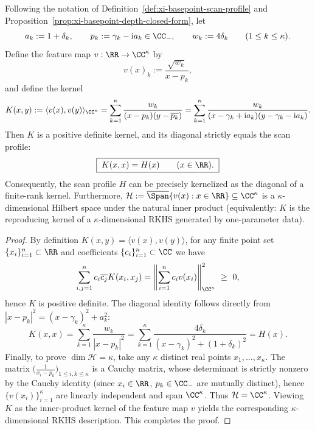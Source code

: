 \begin{theorem}\label{thm:xi-basepoint-scan-finite-rank-rkhs}
Following the notation of Definition~\ref{def:xi-basepoint-scan-profile} and Proposition~\ref{prop:xi-basepoint-depth-closed-form}, let
\[
a_k:=1+\delta_k,\qquad
p_k:=\gamma_k-\mathrm{i}a_k\in\CC_{-},\qquad
w_k:=4\delta_k\qquad(1\le k\le \kappa).
\]
Define the feature map \(v:\RR\to\CC^{\kappa}\) by
\[
v(x)_k:=\frac{\sqrt{w_k}}{x-p_k},
\]
and define the kernel
\[
K(x,y):=\langle v(x),v(y)\rangle_{\CC^{\kappa}}
=\sum_{k=1}^{\kappa}\frac{w_k}{(x-p_k)(y-\overline{p_k})}
=\sum_{k=1}^{\kappa}\frac{w_k}{(x-\gamma_k+\mathrm{i}a_k)(y-\gamma_k-\mathrm{i}a_k)}.
\]
Then \(K\) is a positive definite kernel, and its diagonal strictly equals the scan profile:
\[
\boxed{\;K(x,x)=H(x)\qquad(x\in\RR).\;}
\]
Consequently, the scan profile \(H\) can be precisely kernelized as the diagonal of a finite-rank kernel.
Furthermore, \(\mathcal{H}:=\overline{\Span}\{v(x):x\in\RR\}\subseteq\CC^\kappa\) is a \(\kappa\)-dimensional Hilbert space under the natural inner product (equivalently: \(K\) is the reproducing kernel of a \(\kappa\)-dimensional RKHS generated by one-parameter data).
\end{theorem}
\begin{proof}
By definition \(K(x,y)=\langle v(x),v(y)\rangle\), for any finite point set \(\{x_i\}_{i=1}^{n}\subset\RR\) and coefficients \(\{c_i\}_{i=1}^{n}\subset\CC\) we have
\[
\sum_{i,j=1}^{n}c_i\overline{c_j}K(x_i,x_j)
=\left\|\sum_{i=1}^{n}c_i v(x_i)\right\|_{\CC^\kappa}^2\ \ge\ 0,
\]
hence \(K\) is positive definite.
The diagonal identity follows directly from \(|x-p_k|^2=(x-\gamma_k)^2+a_k^2\):
\[
K(x,x)=\sum_{k=1}^{\kappa}\frac{w_k}{|x-p_k|^2}
=\sum_{k=1}^{\kappa}\frac{4\delta_k}{(x-\gamma_k)^2+(1+\delta_k)^2}
=H(x).
\]
Finally, to prove \(\dim\mathcal{H}=\kappa\), take any \(\kappa\) distinct real points \(x_1,\dots,x_\kappa\).
The matrix \(\bigl(\frac{1}{x_i-p_k}\bigr)_{1\le i,k\le\kappa}\) is a Cauchy matrix, whose determinant is strictly nonzero by the Cauchy identity (since \(x_i\in\RR\), \(p_k\in\CC_{-}\) are mutually distinct), hence \(\{v(x_i)\}_{i=1}^{\kappa}\) are linearly independent and span \(\CC^\kappa\).
Thus \(\mathcal{H}=\CC^\kappa\).
Viewing \(K\) as the inner-product kernel of the feature map \(v\) yields the corresponding \(\kappa\)-dimensional RKHS description. This completes the proof.
\end{proof}

